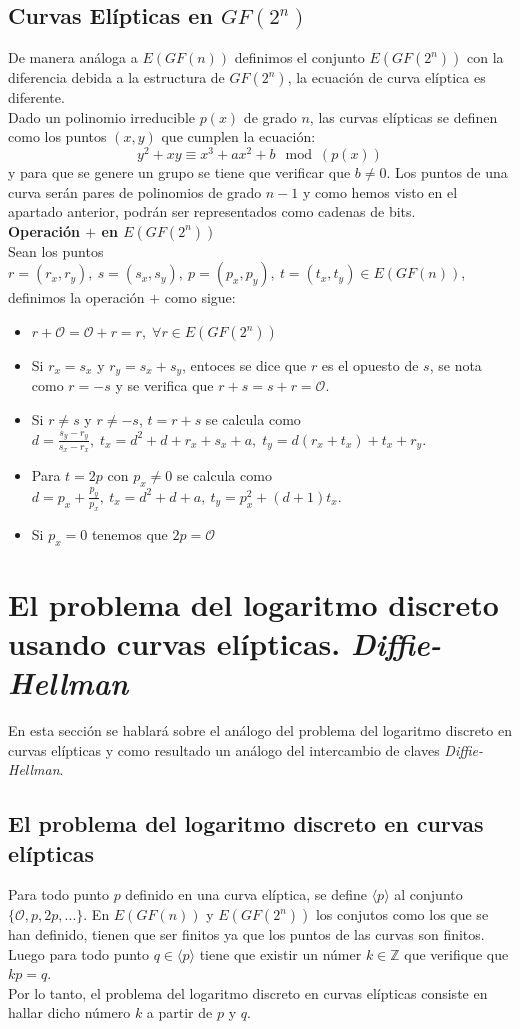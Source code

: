 \begin{aligned*}
\subsection{Curvas Elípticas en $GF(2^n)$}

De manera análoga a $E(GF(n))$ definimos el conjunto $E(GF(2^n))$ con la diferencia debida a la estructura de $GF(2^n)$, la ecuación de curva elíptica es diferente.\\
Dado un polinomio irreducible $p(x)$ de grado $n$, las curvas elípticas se definen como los puntos $(x,y)$ que cumplen la ecuación:
$$
	y^2+xy \equiv x^3+ax^2+b \mod (p(x))
$$
y para que se genere un grupo se tiene que verificar que $b\neq 0$.
Los puntos de una curva serán pares de polinomios de grado $n-1$ y como hemos visto en el apartado anterior, podrán ser representados como cadenas de bits.\\

\textbf{Operación $+$ en $E(GF(2^n))$}\\
Sean los puntos $r=(r_x,r_y),\: s=(s_x,s_y),\: p=(p_x,p_y),\: t=(t_x,t_y)\in E(GF(n))$, definimos la operación $+$  como sigue:
\begin{itemize}
	\item $r+\mathcal{O}=\mathcal{O}+r=r,\; \forall r \in E(GF(2^n))$
	\item Si $r_x=s_x$ y $r_y=s_x+s_y$, entoces se dice que $r$ es el opuesto de $s$, se nota como $r=-s$ y se verifica que $r+s=s+r=\mathcal{O}$.
	\item Si $r\neq s$ y $r\neq-s$, $t=r+s$ se calcula como $d=\frac{s_y-r_y}{s_x-r_x},\; t_x=d^2+d+r_x+s_x+a,\; t_y=d(r_x+t_x)+t_x+r_y$.
	\item Para $t=2p$ con $p_x\neq 0$ se calcula como $d=p_x+\frac{p_y}{p_x}, \: t_x=d^2+d+a, \: t_y=p_x^2+(d+1)t_x$.
	\item Si $p_x=0$ tenemos que $2p=\mathcal{O}$
\end{itemize}

\section{El problema del logaritmo discreto usando curvas elípticas. \emph{Diffie-Hellman}}
En esta sección se hablará sobre el análogo del problema del logaritmo discreto en curvas elípticas y como resultado un análogo del intercambio de claves \emph{Diffie-Hellman}.

\subsection{El problema del logaritmo discreto en curvas elípticas}
Para todo punto $p$ definido en una curva elíptica, se define $\langle p\rangle$ al conjunto $\{\mathcal{O}, p, 2p, ... \}$.
En $E(GF(n))$ y $E(GF(2^n))$ los conjutos como los que se han definido, tienen que ser finitos ya que los puntos de las curvas son finitos. Luego para todo punto $q\in \langle p\rangle$ tiene que existir un númer $k \in \mathbb{Z}$ que verifique que $kp=q$.\\
Por lo tanto, el problema del logaritmo discreto en curvas elípticas consiste en hallar dicho número $k$ a partir de $p$ y $q$.

\end{aligned*}
